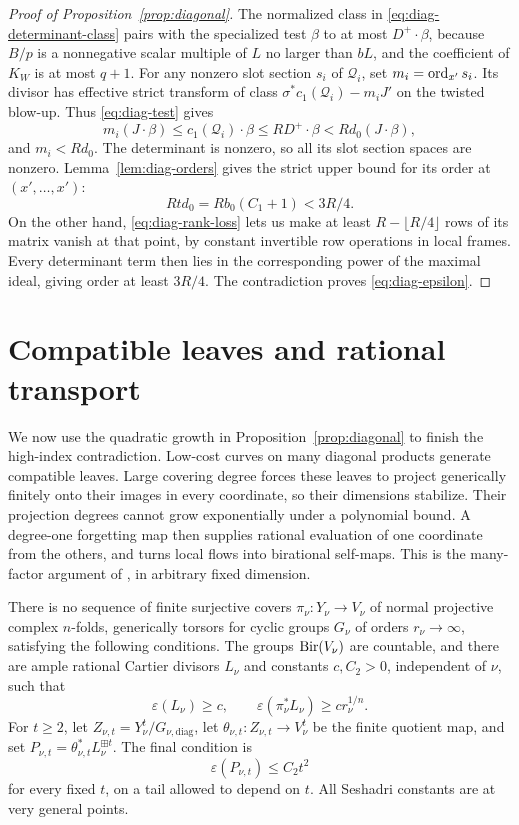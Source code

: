 \begin{proof}[Proof of Proposition~\ref{prop:diagonal}]
The normalized class in \eqref{eq:diag-determinant-class} pairs
with the specialized test $\beta$ to at most $D^+\cdot\beta$,
because $B/p$ is a nonnegative scalar multiple of $L$ no larger
than $bL$, and the coefficient of $K_W$ is at most $q+1$.
For any nonzero slot section $s_i$ of $\mathcal Q_i$, set
$m_i=\operatorname{ord}_{x'}s_i$. Its divisor has effective strict transform
of class $\sigma^*c_1(\mathcal Q_i)-m_iJ'$ on the twisted
blow-up. Thus \eqref{eq:diag-test} gives
\[
 m_i(J\cdot\beta)
 \le c_1(\mathcal Q_i)\cdot\beta
 \le R D^+\cdot\beta<Rd_0(J\cdot\beta),
\]
and $m_i<Rd_0$.
The determinant is nonzero, so all its slot section spaces are
nonzero. Lemma~\ref{lem:diag-orders} gives the strict upper bound
for its order at $(x',\ldots,x')$:
\[
 Rt d_0=Rb_0(C_1+1)<3R/4.
\]
On the other hand, \eqref{eq:diag-rank-loss} lets us make at
least $R-\lfloor R/4\rfloor$ rows of its matrix vanish at that
point, by constant invertible row operations in local frames.
Every determinant term then lies in the corresponding power of
the maximal ideal, giving order at least $3R/4$. The contradiction
proves \eqref{eq:diag-epsilon}.
\end{proof}

\section{Compatible leaves and rational transport}\label{sec:transport}

We now use the quadratic growth in Proposition~\ref{prop:diagonal}
to finish the high-index contradiction. Low-cost curves on many
diagonal products generate compatible leaves. Large covering degree
forces these leaves to project generically finitely onto their images
in every coordinate, so their dimensions stabilize. Their projection degrees cannot grow
exponentially under a polynomial bound. A degree-one forgetting
map then supplies rational evaluation of one coordinate from the
others, and turns local flows into birational self-maps.
This is the many-factor argument of \cite[Section~8]{U4}, in
arbitrary fixed dimension.

\begin{proposition}\label{prop:index-contradiction}
There is no sequence of finite surjective covers
$\pi_\nu:Y_\nu\to V_\nu$ of normal projective complex $n$-folds,
generically torsors for cyclic groups $G_\nu$ of orders
$r_\nu\to\infty$, satisfying the
following conditions. The groups $\operatorname{Bir}(V_\nu)$ are countable,
and there are ample rational Cartier divisors $L_\nu$ and constants
$c,C_2>0$, independent of $\nu$, such that
\[
 \varepsilon(L_\nu)\ge c,\qquad
 \varepsilon(\pi_\nu^*L_\nu)\ge cr_\nu^{1/n}.
\]
For $t\ge2$, let $Z_{\nu,t}=Y_\nu^t/G_{\nu,\mathrm{diag}}$,
let $\theta_{\nu,t}:Z_{\nu,t}\to V_\nu^t$ be the finite
quotient map, and set $P_{\nu,t}=\theta_{\nu,t}^*L_\nu^{\boxplus t}$.
The final condition is
\[
 \varepsilon(P_{\nu,t})\le C_2t^2
\]
for every fixed $t$, on a tail allowed to depend on $t$.
All Seshadri constants are at very general points.
\end{proposition}

